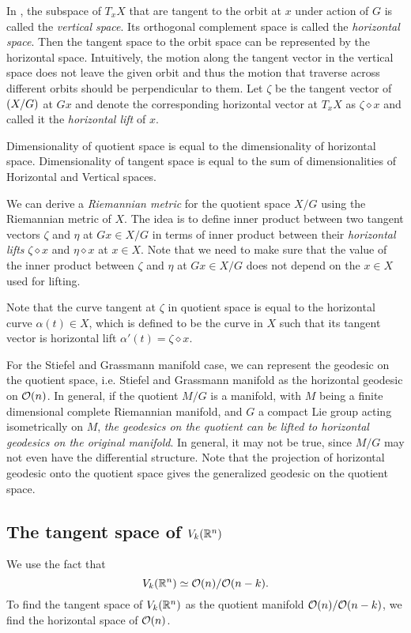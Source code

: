 \documentclass[11pt]{article}
\begin{document}
In \citep{kobayashi1963foundations}, the subspace of $T_{x}X$ that are tangent to the orbit at $x$ under action of $G$ is called the \emph{vertical space}. Its  orthogonal complement space is called the \emph{horizontal space}. Then the tangent  space to the orbit space can be represented by the horizontal space. Intuitively, the motion along the tangent vector in the vertical space does not leave the given orbit and thus the motion that traverse across different orbits should be  perpendicular to them. Let $\zeta$ be the tangent vector of $\left(X/G\right)$ at $Gx$ and  denote the corresponding horizontal vector at $T_{x}X$ as $\zeta\diamond x$ and called it the \emph{horizontal lift} of $x$.

Dimensionality of quotient space is equal to the dimensionality of horizontal space. Dimensionality of tangent space is equal to the sum of dimensionalities of Horizontal and Vertical spaces. 

We can derive a \emph{Riemannian metric} for the quotient space $X/G$ using the Riemannian metric of $X$. The idea is to define inner product between two tangent vectors $\zeta$ and $\eta$ at $Gx \in X/G$ in terms of inner product between their \emph{horizontal lifts} $\zeta\diamond x$ and $\eta\diamond x$ at $x\in X$. Note that we need to make sure that the value of the inner product between $\zeta$ and $\eta$ at $Gx \in X/G$ does not depend on the $x \in X$ used for lifting.

Note that the curve tangent at $\zeta$ in quotient space is equal to the horizontal curve $\alpha(t)\in X$, which is defined to be the curve in $X$ such that its tangent vector is horizontal lift $\alpha'(t) = \zeta\diamond x$.

For the Stiefel and Grassmann manifold case, we can represent the geodesic on the quotient space, i.e.  Stiefel and Grassmann manifold as the horizontal geodesic on ${\mathcal O}(n)$. In general, if the quotient $M/G$ is a manifold, with $M$ being a finite dimensional complete Riemannian manifold, and $G$ a compact Lie group acting isometrically on $M$,  \emph{the geodesics on the quotient can be lifted to horizontal geodesics on the original manifold}.  In general, it may not be true, since  $M/G$ may not even have the differential structure. Note that the projection of horizontal geodesic onto the quotient space gives the generalized geodesic on the quotient space. 


\subsection{The tangent space of $V_{k}({\mathbb R}^{n})$}
We use the fact that $$V_{k}({\mathbb R}^{n}) \simeq {\mathcal O}(n)/{\mathcal O}(n-k).$$ To find the tangent space of $V_{k}({\mathbb R}^{n})$ as the quotient manifold ${\mathcal O}(n)/{\mathcal O}(n-k)$, we find the horizontal space of ${\mathcal O}(n)$. 
\end{document}
